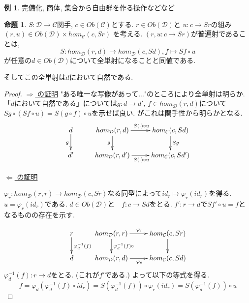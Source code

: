 \documentclass[dvipdfmx,a4paper,11pt]{article}
\theoremstyle{definition}
\newtheorem{prop}[thm]{命題}
\newtheorem{exa}[thm]{例}
\begin{document}
\begin{exa}
完備化, 商体, 集合から自由群を作る操作などなど
\end{exa}


 \begin{tcolorbox}
 [colback = white, colframe = green!35!black, fonttitle = \bfseries,breakable = true]
\begin{prop}
\label{prop-yoneda-universe}
$S : \mathcal{D} \to \mathcal{C}$関手, $c \in Ob(\mathcal{C})$とする.
$r \in Ob(\mathcal{D})$と $u: c \to Sr$の組み$(r,u) \in Ob(\mathcal{D})\times hom_{\mathcal{C}}(c, Sr)$
を考える.
$(r,u: c\to Sr)$が普遍射であることは, 
$$
S : hom_{\mathcal{D}}(r,d) \to hom_{\mathcal{D}}(c, Sd), f \mapsto Sf \circ u
$$
が任意の$d \in Ob(\mathcal{D})$について全単射になることと同値である. 

そしてこの全単射は$d$において自然である.
\end{prop}
\end{tcolorbox}

\begin{proof}
\underline{ $\Rightarrow$ の証明}
"ある唯一な写像があって..."のところにより全単射は明らか.
「$d$において自然である」については$g : d \to d'$, $f \in hom_{\mathcal{D}}(r,d) $について
$Sg \circ(Sf \circ u) = S(g \circ f) \circ u$を示せば良い. がこれは関手性から明らかとなる. 
\begin{equation*}
\xymatrix@C=25pt@R=20pt{
d\ar@{->}[d]_{g}
&hom_{\mathcal{D}}(r,d) \ar@{->}[d]_{g}  \ar@{->}[r]^{S(\cdot)\circ u}
 & hom_{\mathcal{C}}(c, Sd) \ar@{->}[d]^{Sg} \\
d' 
&hom_{\mathcal{D}}(r,d') \ar@{->}[r]_{S(\cdot)\circ u} 
& hom_{\mathcal{C}}(c, Sd')\\   
}
\end{equation*}

\underline{$\Leftarrow$  の証明}

$\varphi_{r} : hom_{\mathcal{D}}(r,r) \to hom_{\mathcal{D}}(c, Sr)$なる同型によって$id_r \mapsto \varphi_r(id_r)$を得る. $u=\varphi_r(id_r)$である. 
$d \in Ob(\mathcal{D})$と　$f : c\to Sd$をとる.
$f' : r \to d$で$Sf' \circ u =f$となるものの存在を示す.

\begin{equation*}
\xymatrix@C=25pt@R=20pt{
r\ar@{->}[d]^{\varphi_{d}^{-1}(f) }&
hom_{\mathcal{D}}(r,r) \ar@{->}[d]^{\varphi_{d}^{-1}(f) \circ }  \ar@{->}[r]^{\varphi_{r} }
 & hom_{\mathcal{C}}(c, Sr) \ar@{->}[d]\\
 d &
hom_{\mathcal{D}}(r,d) \ar@{->}[r]_{\varphi_{d} }
& hom_{\mathcal{C}}(c, Sd)\\   
}
\end{equation*}
$\varphi_{d}^{-1}(f) : r \to d$をとる. (これが$f'$である.)
よって以下の等式を得る.
$$
f =  \varphi_{d}(\varphi_{d}^{-1}(f) \circ id_{r})
= S(\varphi_{d}^{-1}(f)) \circ  \varphi_{r}(id_{r})
= S(\varphi_{d}^{-1}(f)) \circ u
$$

\end{proof}
\end{document}
